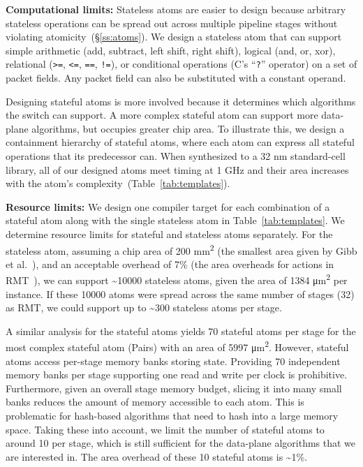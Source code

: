 \textbf{Computational limits:}
Stateless atoms are easier to design because arbitrary stateless operations can
be spread out across multiple pipeline stages without violating
atomicity~(\S\ref{ss:atoms}). We design a stateless atom that can support
simple arithmetic (add, subtract, left shift, right shift), logical (and, or,
xor), relational ({\tt >=}, {\tt <=}, {\tt ==}, {\tt !=}), or conditional operations (C's ``{\tt ?}''
operator) on a set of packet fields. Any packet field can also be substituted
with a constant operand.

Designing stateful atoms is more involved because it determines which
algorithms the switch can support. A more complex stateful atom can support
more data-plane algorithms, but occupies greater chip area. To illustrate this,
we design a containment hierarchy of stateful atoms, where each atom can
express all stateful operations that its predecessor can. When synthesized to a
32 nm standard-cell library, all of our designed atoms meet timing at 1 GHz and their area
increases with the atom's complexity~(Table~\ref{tab:templates}).

\textbf{Resource limits:}
We design one compiler target for each combination of a stateful atom along
with the single stateless atom in Table~\ref{tab:templates}.  We determine
resource limits for stateful and stateless atoms separately.  For the stateless
atom, assuming a chip area of 200 \si{\milli\metre\squared} (the smallest area given by Gibb et
al.~\cite{gibb_parsing}), and an acceptable overhead of 7\% (the area overheads
for actions in RMT~\cite{rmt}), we can support \textasciitilde10000 stateless atoms, given
the area of 1384 \si{\micro\metre\squared} per instance.  If these 10000 atoms were
spread across the same number of stages (32) as RMT, we could support up to
\textasciitilde300 stateless atoms per stage.


A similar analysis for the stateful atoms yields 70 stateful atoms per stage for
the most complex stateful atom (Pairs) with an area of 5997 \si{\micro\metre\squared}.
However, stateful atoms access per-stage memory banks storing state.
Providing 70 independent memory banks per stage supporting one read and
write per clock is prohibitive. Furthermore, given an overall stage memory budget,
slicing it into many small banks reduces the amount of memory accessible to
each atom. This is problematic for hash-based algorithms that need to hash into
a large memory space. Taking these into account, we limit the number of
stateful atoms to around 10 per stage, which is still sufficient for the
data-plane algorithms that we are interested in. The area overhead of these 10
stateful atoms is \textasciitilde1\%.

